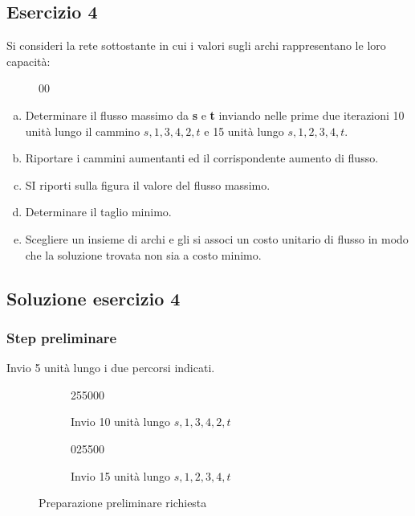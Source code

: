\documentclass[\main/main.tex]{subfiles}
\def\redFlag{25500}
\def\blackFlag{0}
\newcommand{\currentGraphPreloader}[9]{
  \def\currentGraphArgI{#1}%
  \def\currentGraphArgII{#2}%
  \def\currentGraphArgIII{#3}%
  \def\currentGraphArgIV{#4}%
  \def\currentGraphArgV{#5}%
  \def\currentGraphArgVI{#6}%
  \def\currentGraphArgVII{#7}%
  \def\currentGraphArgVIII{#8}%
  \def\currentGraphArgIX{#9}%
  \secondCurrentGraphPreloader
}
\newcommand{\secondCurrentGraphPreloader}[9]{
  \def\currentGraphArgX{#1}%
  \def\currentColorI{#2}%
  \def\currentColorII{#3}%
  \def\currentColorIII{#4}%
  \def\currentColorIV{#5}%
  \def\currentColorV{#6}%
  \def\currentColorVI{#7}%
  \def\currentColorVII{#8}%
  \def\currentColorVIII{#9}%
  \currentGraph
}
\begin{document}
\subsection{Esercizio 4}
Si consideri la rete sottostante in cui i valori sugli archi rappresentano le loro capacità:

\begin{figure}
  \currentGraphPreloader
  {0}{0}{0}{0}{0}
  {0}{0}{0}{0}{0}
  {\blackFlag}{\blackFlag}{\blackFlag}{\blackFlag}{\blackFlag}
  {\blackFlag}{\blackFlag}{\blackFlag}{\blackFlag}{\blackFlag}
\end{figure}

\begin{enumerate}[a)]
  \item Determinare il flusso massimo da \textbf{s} e \textbf{t} inviando nelle prime due iterazioni 10 unità lungo il cammino $s,1,3,4,2,t$ e 15 unità lungo $s,1,2,3,4,t$.
  \item Riportare i cammini aumentanti ed il corrispondente aumento di flusso.
  \item SI riporti sulla figura il valore del flusso massimo.
  \item Determinare il taglio minimo.
  \item Scegliere un insieme di archi e gli si associ un costo unitario di flusso in modo che la soluzione trovata non sia a costo minimo.
\end{enumerate}

\subsection{Soluzione esercizio 4}
\subsubsection*{Step preliminare}
Invio 5 unità lungo i due percorsi indicati.

\begin{figure}
  \begin{subfigure}{0.49\textwidth}
    \currentGraphPreloader
    {10}{0}{10}{10}{0}
    {10}{0}{0}{10}{0}
    {\redFlag}{\blackFlag}{\redFlag}{\redFlag}{\blackFlag}
    {\redFlag}{\blackFlag}{\blackFlag}{\redFlag}{\blackFlag}
    \caption{Invio 10 unità lungo $s,1,3,4,2,t$}
  \end{subfigure}
  \begin{subfigure}{0.49\textwidth}
    \currentGraphPreloader
    {25}{0}{10}{25}{0}
    {10}{15}{15}{10}{15}
    {\redFlag}{\blackFlag}{\blackFlag}{\redFlag}{\blackFlag}
    {\blackFlag}{\redFlag}{\redFlag}{\blackFlag}{\redFlag}
    \caption{Invio 15 unità lungo $s,1,2,3,4,t$}
  \end{subfigure}
  \caption{Preparazione preliminare richiesta}
\end{figure}
\end{document}
